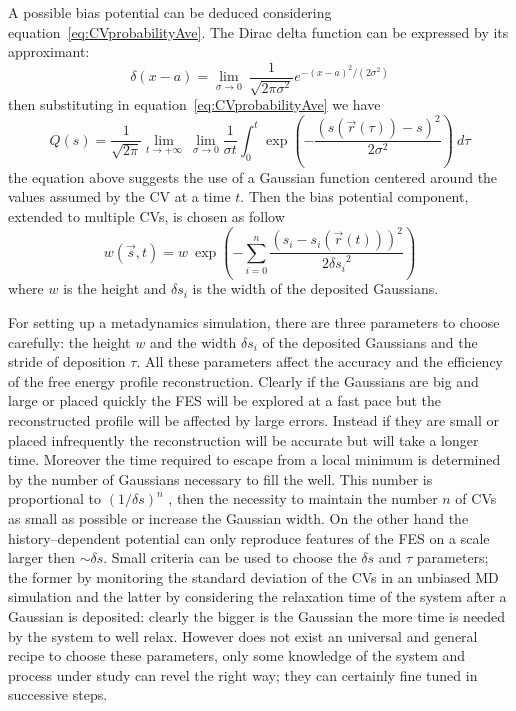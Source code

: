 A possible bias potential can be deduced considering equation~\eqref{eq:CVprobabilityAve}. The Dirac delta 
function can be expressed by its approximant:  
\begin{equation*}
	\delta(x-a) = \lim_{\sigma\to 0}\ \frac{1}{\sqrt{2 \pi \sigma^2}}e^{-(x-a)^2/(2\sigma^2)}
\end{equation*}
then substituting in equation~\eqref{eq:CVprobabilityAve} we have
\begin{equation*}
	Q(s) = \frac{1}{\sqrt{2\pi}}\lim_{t\to +\infty}\ \lim_{\sigma\to 0} \frac{1}{\sigma t}\int_0^t \exp{ \left ( -\frac{(s(\vec r(\tau))-s)^2}{2\sigma^2} \right )} \ d\tau
\end{equation*}
the equation above suggests the use of a Gaussian function centered around the values assumed by the \ac{CV} at a 
time $t$. Then the bias potential component, extended to multiple \acp{CV}, is chosen as follow
\begin{equation*}
	w(\vec s, t) = w\ \exp\left ({-\sum_{i=0}^n \frac{(s_i - s_i(\vec r(t)))^2}{2{\delta s_i}^2} }\right )
\end{equation*}
where $w$ is the height and $\delta s_i$ is the width of the deposited Gaussians.

For setting up a metadynamics simulation, there are three parameters to choose carefully: the height $w$ and the width $\delta s_i$ of the deposited Gaussians and the stride of deposition $\tau$. All these parameters affect the accuracy and the efficiency of the free energy profile reconstruction. Clearly if the Gaussians are big and large or placed quickly the \ac{FES} will be explored at a fast pace but the reconstructed profile will be affected by large errors. Instead if they are small or placed infrequently the reconstruction will be accurate but will take a longer time. Moreover the time required to escape from a local minimum is determined by the number of Gaussians necessary to fill the well. This number is proportional to $(1/\delta s)^n$ \cite{MetadReview}, then the necessity to maintain the number $n$ of \acp{CV} as small as possible or increase the Gaussian width. On the other hand the history--dependent potential can only reproduce features of the \ac{FES} on a scale larger then $\sim \delta s$. Small criteria can be used to choose the $\delta s$ and $\tau$ parameters; the former by monitoring the standard deviation of the \acp{CV} in an unbiased \ac{MD} simulation and the latter by considering the relaxation time of the system after a Gaussian is deposited: clearly the bigger is the Gaussian the more time is needed by the system to well relax. However does not exist an universal and general recipe to choose these parameters, only some knowledge of the system and process under study can revel the right way; they can certainly fine tuned in successive steps.


